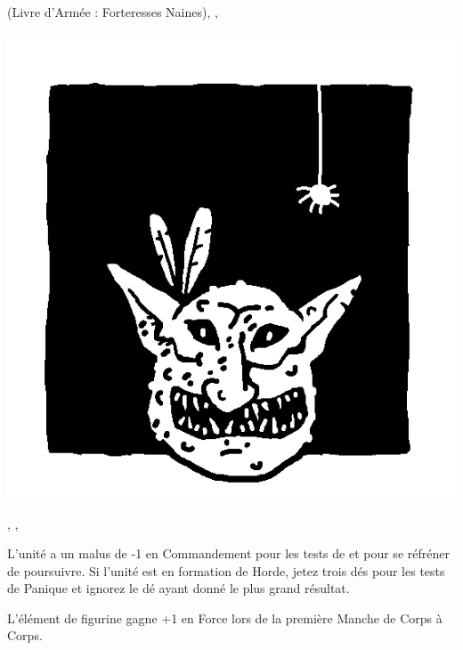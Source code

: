 \begin{multicols}{3}
\begin{center}
\hatred{} (Livre d'Armée : Forteresses Naines), \unruly{}, \insignificant{}
\end{center}

\columnbreak

\begin{center}
\includegraphics[width=\logosize]{pics/forestgoblin.png}
\vspace*{-1cm}\subsubtitle{\forestgoblin}

\strider{\forest}, \unruly{}, \insignificant{}
\end{center}

\end{multicols}

\armyspecialruleentry{\unruly}

L'unité a un malus de -1 en Commandement pour les tests de \frenzy{} et pour se réfréner de poursuivre. Si l'unité est en formation de Horde, jetez trois dés pour les tests de Panique et ignorez le dé ayant donné le plus grand résultat.

\armyspecialruleentry{\borntofight}

L'élément de figurine gagne +1 en Force lors de la première Manche de Corps à Corps.


